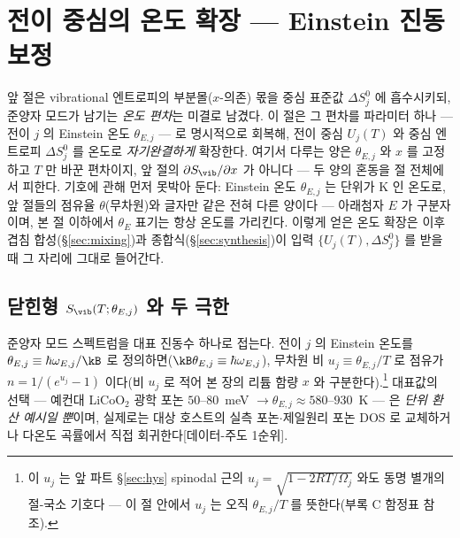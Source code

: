 \section{전이 중심의 온도 확장 --- Einstein 진동 보정}\label{sec:einstein}

앞 절은 vibrational 엔트로피의 부분몰($x$-의존) 몫을 중심 표준값 $\Delta S^0_j$ 에 흡수시키되, 준양자 모드가
남기는 \emph{온도 편차}는 미결로 남겼다. 이 절은 그 편차를 파라미터 하나 --- 전이 $j$ 의 Einstein 온도
$\theta_{E,j}$ --- 로 명시적으로 회복해, 전이 중심 $U_j(T)$ 와 중심 엔트로피 $\Delta S^0_j$ 를 온도로
\emph{자기완결하게} 확장한다. 여기서 다루는 양은 $\theta_{E,j}$ 와 $x$ 를 고정하고 $T$ 만 바꾼 편차이지, 앞
절의 $\partial S_\vib/\partial x$ 가 아니다 --- 두 양의 혼동을 절 전체에서 피한다. 기호에 관해 먼저 못박아
둔다: Einstein 온도 $\theta_{E,j}$ 는 단위가 K 인 온도로, 앞 절들의 점유율 $\theta$(무차원)와 글자만 같은
전혀 다른 양이다 --- 아래첨자 $E$ 가 구분자이며, 본 절 이하에서 $\theta_E$ 표기는 항상 온도를 가리킨다.
이렇게 얻은 온도 확장은 이후
겹침 합성(\S\ref{sec:mixing})과 종합식(\S\ref{sec:synthesis})이 입력 $\{U_j(T),\Delta S^0_j\}$ 를 받을 때 그
자리에 그대로 들어간다.

\subsection{닫힌형 $S_\vib(T;\theta_{E,j})$ 와 두 극한}\label{ssec:einstein-closed}
준양자 모드 스펙트럼을 대표 진동수 하나로 접는다. 전이 $j$ 의 Einstein 온도를 $\theta_{E,j}\equiv\hbar
\omega_{E,j}/\kB$ 로 정의하면($\kB\theta_{E,j}\equiv\hbar\omega_{E,j}$), 무차원 비 $u_j\equiv\theta_{E,j}/T$ 로
점유가 $n=1/(e^{u_j}-1)$ 이다(비 $u_j$ 로 적어 본 장의 리튬 함량 $x$ 와 구분한다).\footnote{이 $u_j$ 는
앞 파트 \S\ref{sec:hys} spinodal 근의 $u_j=\sqrt{1-2RT/\Omega_j}$ 와도 동명 별개의 절-국소 기호다 --- 이 절
안에서 $u_j$ 는 오직 $\theta_{E,j}/T$ 를 뜻한다(부록 C 함정표 참조).} 대표값의 선택 --- 예컨대
LiCoO$_2$ 광학 포논 $50$--$80$~meV $\to\theta_{E,j}\approx580$--$930$~K --- 은 \emph{단위 환산 예시일 뿐}이며,
실제로는 대상 호스트의 실측 포논$\cdot$제일원리 포논 DOS \cite{jpcc2021} 로 교체하거나 다온도 곡률에서 직접
회귀한다[데이터-주도 1순위].

